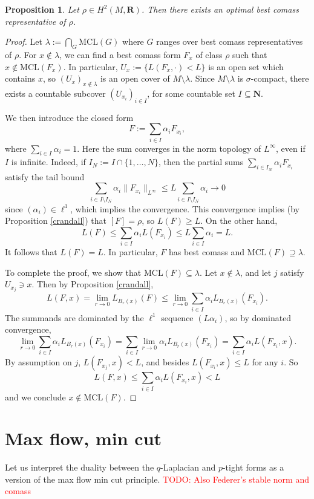 \documentclass[reqno,11pt]{amsart}
\newcommand{\NN}{\mathbf{N}}
\newcommand{\RR}{\mathbf{R}}
\newcommand{\MCL}{\mathrm{MCL}}
\newtheorem{proposition}[theorem]{Proposition}
\theoremstyle{definition}
\numberwithin{equation}{section}
\newcommand\todo[1]{\textcolor{red}{TODO: #1}}
\begin{document}
\begin{proposition}
Let $\rho \in H^2(M, \RR)$.
Then there exists an optimal best comass representative of $\rho$.
\end{proposition}
\begin{proof}
Let $\lambda := \bigcap_G \MCL(G)$ where $G$ ranges over best comass representatives of $\rho$.
For $x \notin \lambda$, we can find a best comass form $F_x$ of class $\rho$ such that $x \notin \MCL(F_x)$.
In particular, $U_x := \{L(F_x, \cdot) < L\}$ is an open set which contains $x$, so $(U_x)_{x \notin \lambda}$ is an open cover of $M \setminus \lambda$.
Since $M \setminus \lambda$ is $\sigma$-compact, there exists a countable subcover $(U_{x_i})_{i \in I}$, for some countable set $I \subseteq \NN$.

We then introduce the closed form 
$$F := \sum_{i \in I} \alpha_i F_{x_i},$$
where $\sum_{i \in I} \alpha_i = 1$.
Here the sum converges in the norm topology of $L^\infty$, even if $I$ is infinite.
Indeed, if $I_N := I \cap \{1, \dots, N\}$, then the partial sums $\sum_{i \in I_N} \alpha_i F_{x_i}$ satisfy the tail bound
$$\sum_{i \in I \setminus I_N} \alpha_i \|F_{x_i}\|_{L^\infty} \leq L \sum_{i \in I \setminus I_N} \alpha_i \to 0$$
since $(\alpha_i) \in \ell^1$, which implies the convergence.
This convergence implies (by Proposition \ref{crandall}) that $[F] = \rho$, so $L(F) \geq L$.
On the other hand, 
$$L(F) \leq \sum_{i \in I} \alpha_i L(F_{x_i}) \leq L \sum_{i \in I} \alpha_i = L.$$
It follows that $L(F) = L$.
In particular, $F$ has best comass and $\MCL(F) \supseteq \lambda$.

To complete the proof, we show that $\MCL(F) \subseteq \lambda$.
Let $x \notin \lambda$, and let $j$ satisfy $U_{x_j} \ni x$.
Then by Proposition \ref{crandall},
$$L(F, x) = \lim_{r \to 0} L_{B_r(x)}(F) \leq \lim_{r \to 0} \sum_{i \in I} \alpha_i L_{B_r(x)}(F_{x_i}).$$
The summands are dominated by the $\ell^1$ sequence $(L\alpha_i)$, so by dominated convergence, 
$$\lim_{r \to 0} \sum_{i \in I} \alpha_i L_{B_r(x)}(F_{x_i}) = \sum_{i \in I} \lim_{r \to 0} \alpha_i L_{B_r(x)}(F_{x_i}) = \sum_{i \in I} \alpha_i L(F_{x_i}, x).$$
By assumption on $j$, $L(F_{x_j}, x) < L$, and besides $L(F_{x_i}, x) \leq L$ for any $i$.
So 
$$L(F, x) \leq \sum_{i \in I} \alpha_i L(F_{x_i}, x) < L$$
and we conclude $x \notin \MCL(F)$.
\end{proof}

\appendix 
\section{Max flow, min cut}\label{Max Flow Min Cut}
Let us interpret the duality between the $q$-Laplacian and $p$-tight forms as a version of the max flow min cut principle. 
\todo{Also Federer's stable norm and comass}
\end{document}
